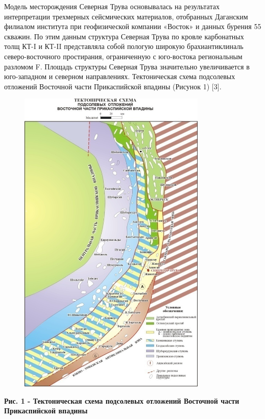 Модель месторождения Северная Трува основывалась на результатах
интерпретации трехмерных сейсмических материалов, отобранных Даганским
филиалом института при геофизической компании «Восток» и данных бурения
55 скважин. По этим данным структура Северная Трува по кровле
карбонатных толщ КТ-I и КТ-II представляла собой пологую широкую
брахиантиклиналь северо-восточного простирания, ограниченную с
юго-востока региональным разломом F. Площадь структуры Северная Трува
значительно увеличивается в юго-западном и северном направлениях.
Тектоническая схема подсолевых отложений Восточной части Прикаспийской
впадины (Рисунок 1) {[}3{]}.

\begin{figure}[H]
	\centering
	\includegraphics[width=0.8\textwidth]{assets/301}
	\caption*{}
\end{figure}

{\bfseries Рис. 1 - Тектоническая схема подсолевых отложений Восточной
части Прикаспийской впадины}

